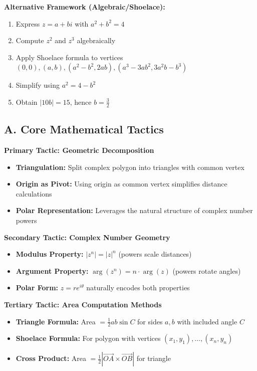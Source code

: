 \documentclass[12pt]{article}
\begin{document}
\begin{strategicbox}
\textbf{Alternative Framework (Algebraic/Shoelace):}
\begin{enumerate}
    \item Express $z = a + bi$ with $a^2 + b^2 = 4$
    \item Compute $z^2$ and $z^3$ algebraically
    \item Apply Shoelace formula to vertices $(0,0), (a,b), (a^2-b^2, 2ab), (a^3-3ab^2, 3a^2b-b^3)$
    \item Simplify using $a^2 = 4 - b^2$
    \item Obtain $|10b| = 15$, hence $b = \frac{3}{2}$
\end{enumerate}
\end{strategicbox}

\vspace{1em}

\begin{tacticalbox}
\subsection*{A. Core Mathematical Tactics}

\textbf{Primary Tactic: Geometric Decomposition}
\begin{itemize}
    \item \textbf{Triangulation:} Split complex polygon into triangles with common vertex
    \item \textbf{Origin as Pivot:} Using origin as common vertex simplifies distance calculations
    \item \textbf{Polar Representation:} Leverages the natural structure of complex number powers
\end{itemize}

\textbf{Secondary Tactic: Complex Number Geometry}
\begin{itemize}
    \item \textbf{Modulus Property:} $|z^n| = |z|^n$ (powers scale distances)
    \item \textbf{Argument Property:} $\arg(z^n) = n \cdot \arg(z)$ (powers rotate angles)
    \item \textbf{Polar Form:} $z = re^{i\theta}$ naturally encodes both properties
\end{itemize}

\textbf{Tertiary Tactic: Area Computation Methods}
\begin{itemize}
    \item \textbf{Triangle Formula:} Area $= \frac{1}{2}ab\sin C$ for sides $a, b$ with included angle $C$
    \item \textbf{Shoelace Formula:} For polygon with vertices $(x_1, y_1), \ldots, (x_n, y_n)$
    \item \textbf{Cross Product:} Area $= \frac{1}{2}|\vec{OA} \times \vec{OB}|$ for triangle
\end{itemize}


\end{tacticalbox}
\end{document}
